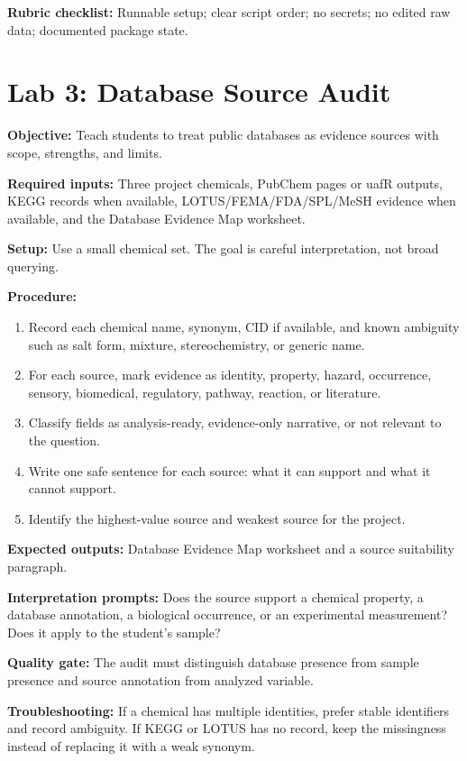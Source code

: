 \textbf{Rubric checklist:} Runnable setup; clear script order; no secrets; no edited raw data; documented package state.

\section{Lab 3: Database Source Audit}
\textbf{Objective:} Teach students to treat public databases as evidence sources with scope, strengths, and limits.

\textbf{Required inputs:} Three project chemicals, PubChem pages or uafR outputs, KEGG records when available, LOTUS/FEMA/FDA/SPL/MeSH evidence when available, and the Database Evidence Map worksheet.

\textbf{Setup:} Use a small chemical set. The goal is careful interpretation, not broad querying.

\textbf{Procedure:}
\begin{enumerate}
  \item Record each chemical name, synonym, CID if available, and known ambiguity such as salt form, mixture, stereochemistry, or generic name.
  \item For each source, mark evidence as identity, property, hazard, occurrence, sensory, biomedical, regulatory, pathway, reaction, or literature.
  \item Classify fields as analysis-ready, evidence-only narrative, or not relevant to the question.
  \item Write one safe sentence for each source: what it can support and what it cannot support.
  \item Identify the highest-value source and weakest source for the project.
\end{enumerate}

\textbf{Expected outputs:} Database Evidence Map worksheet and a source suitability paragraph.

\textbf{Interpretation prompts:} Does the source support a chemical property, a database annotation, a biological occurrence, or an experimental measurement? Does it apply to the student's sample?

\textbf{Quality gate:} The audit must distinguish database presence from sample presence and source annotation from analyzed variable.

\textbf{Troubleshooting:} If a chemical has multiple identities, prefer stable identifiers and record ambiguity. If KEGG or LOTUS has no record, keep the missingness instead of replacing it with a weak synonym.

